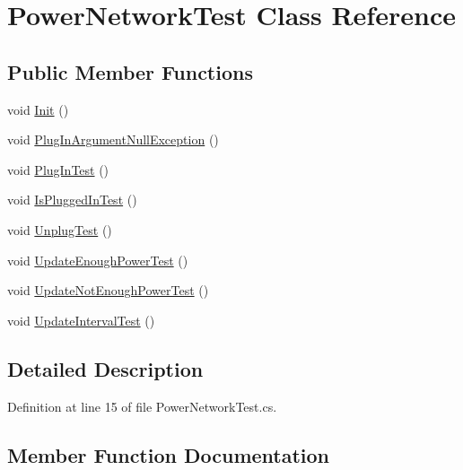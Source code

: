 \hypertarget{class_power_network_test}{}\section{Power\+Network\+Test Class Reference}
\label{class_power_network_test}
\subsection*{Public Member Functions}
\begin{DoxyCompactItemize}
\item 
void \hyperlink{class_power_network_test_af112a71408f75b763037670317a4eb61}{Init} ()
\item 
void \hyperlink{class_power_network_test_af2a34472832c104824ca14ec8b35c6b2}{Plug\+In\+Argument\+Null\+Exception} ()
\item 
void \hyperlink{class_power_network_test_aa4ad29e18a83c9d0b89caa436d0a4606}{Plug\+In\+Test} ()
\item 
void \hyperlink{class_power_network_test_a4dcc395caabda5d3b2ab7f6a620c6385}{Is\+Plugged\+In\+Test} ()
\item 
void \hyperlink{class_power_network_test_af967939f8f257ca7bc9ab5a33283c465}{Unplug\+Test} ()
\item 
void \hyperlink{class_power_network_test_a67fe92519691ff82949c2d2460cc28c2}{Update\+Enough\+Power\+Test} ()
\item 
void \hyperlink{class_power_network_test_a4ef69f3b1637027157a79be4d7719a19}{Update\+Not\+Enough\+Power\+Test} ()
\item 
void \hyperlink{class_power_network_test_a51bcfcbd863f3e9ac9f2699763a36ded}{Update\+Interval\+Test} ()
\end{DoxyCompactItemize}


\subsection{Detailed Description}


Definition at line 15 of file Power\+Network\+Test.\+cs.



\subsection{Member Function Documentation}
\mbox{\label{class_power_network_test_af112a71408f75b763037670317a4eb61}} 
